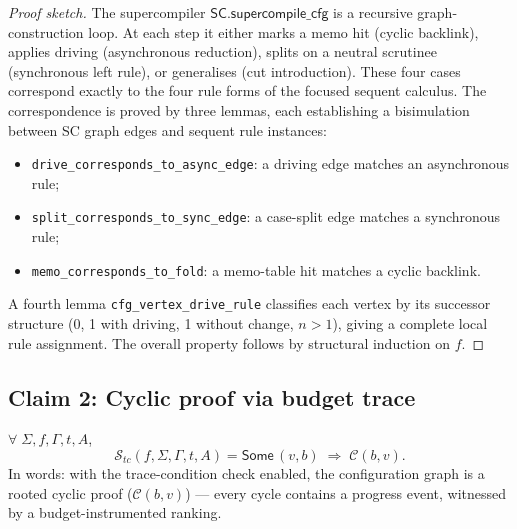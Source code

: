 \begin{proof}[Proof sketch]
The supercompiler $\mathsf{SC.supercompile\_cfg}$ is a recursive graph-construction loop. At each step it either marks a memo hit (cyclic backlink), applies driving (asynchronous reduction), splits on a neutral scrutinee (synchronous left rule), or generalises (cut introduction). These four cases correspond exactly to the four rule forms of the focused sequent calculus. The correspondence is proved by three lemmas, each establishing a bisimulation between SC graph edges and sequent rule instances:
\begin{itemize}[leftmargin=*]
\item \texttt{drive\_corresponds\_to\_async\_edge}: a driving edge matches an asynchronous rule;
\item \texttt{split\_corresponds\_to\_sync\_edge}: a case-split edge matches a synchronous rule;
\item \texttt{memo\_corresponds\_to\_fold}: a memo-table hit matches a cyclic backlink.
\end{itemize}
A fourth lemma \texttt{cfg\_vertex\_drive\_rule} classifies each vertex by its successor structure (0, 1 with driving, 1 without change, $n>1$), giving a complete local rule assignment. The overall property follows by structural induction on $f$.
\end{proof}

\subsection{Claim 2: Cyclic proof via budget trace}

\begin{theorem}
\label{thm:cyclic-proof}
\noindent
$\forall\;\Sigma,f,\Gamma,t,A$,
\[
  \mathcal{S}_{\!\mathit{tc}}(f,\Sigma,\Gamma,t,A) = \mathsf{Some}\,(v,\mathit{b})
  \;\Longrightarrow\;
  \mathcal{C}(\mathit{b},v).
\]
In words: with the trace-condition check enabled, the configuration graph is a rooted cyclic proof ($\mathcal{C}(\mathit{b},v)$) --- every cycle contains a progress event, witnessed by a budget-instrumented ranking.
\end{theorem}

